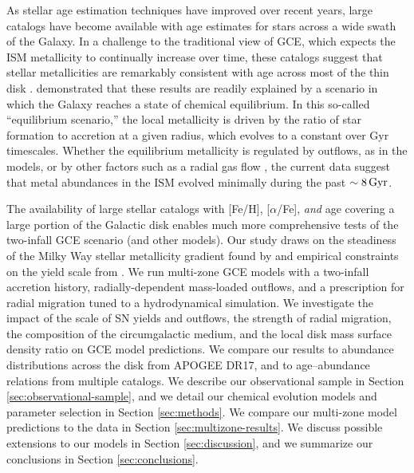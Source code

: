\documentclass[twocolumn,twocolappendix]{aastex701}
\newcommand{\aFe}{[$\alpha$/Fe]\xspace}
\newcommand{\Gyr}{\,{\rm Gyr}}
\begin{document}
As stellar age estimation techniques have improved over recent years, large catalogs have become available with age estimates for stars across a wide swath of the Galaxy. In a challenge to the traditional view of GCE, which expects the ISM metallicity to continually increase over time, these catalogs suggest that stellar metallicities are remarkably consistent with age across most of the thin disk \citep[e.g.,][]{spina_mapping_2022,magrini_gaia-eso_2023,willett_evolution_2023,carbajo-hijarrubia_occaso_2024,gallart_chronology_2024}. \citet{johnson_milky_2025} demonstrated that these results are readily explained by a scenario in which the Galaxy reaches a state of chemical equilibrium. In this so-called ``equilibrium scenario,'' the local metallicity is driven by the ratio of star formation to accretion at a given radius, which evolves to a constant over Gyr timescales. Whether the equilibrium metallicity is regulated by outflows, as in the  \citet{johnson_milky_2025} models, or by other factors such as a radial gas flow \citep{spitoni_effects_2011,bilitewski_radial_2012,sharda_interplay_2024}, the current data suggest that metal abundances in the ISM evolved minimally during the past $\sim8\Gyr$.

The availability of large stellar catalogs with [Fe/H], \aFe, {\it and} age covering a large portion of the Galactic disk enables much more comprehensive tests of the two-infall GCE scenario (and other models). Our study draws on the steadiness of the Milky Way stellar metallicity gradient found by \citet{johnson_milky_2025} and empirical constraints on the yield scale from \citet{weinberg_scale_2024}. We run multi-zone GCE models with a two-infall accretion history, radially-dependent mass-loaded outflows, and a prescription for radial migration tuned to a hydrodynamical simulation. We investigate the impact of the scale of SN yields and outflows, the strength of radial migration, the composition of the circumgalactic medium, and the local disk mass surface density ratio on GCE model predictions. We compare our results to abundance distributions across the disk from APOGEE DR17, and to age--abundance relations from multiple catalogs. We describe our observational sample in Section \ref{sec:observational-sample}, and we detail our chemical evolution models and parameter selection in Section \ref{sec:methods}. We compare our multi-zone model predictions to the data in Section \ref{sec:multizone-results}. We discuss possible extensions to our models in Section \ref{sec:discussion}, and we summarize our conclusions in Section \ref{sec:conclusions}.
\end{document}
